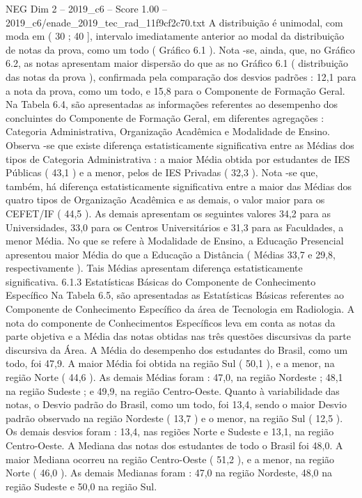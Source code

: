 \begin{textsample}{NEG Dim 2 – 2019\_c6 – Score 1.00 – 2019\_c6/enade\_2019\_tec\_rad\_11f9cf2c70.txt}
A distribuição é unimodal, com moda em ( 30 ; 40 ], intervalo imediatamente anterior ao modal da distribuição de notas da prova, como um todo ( Gráfico 6.1 ).
Nota -se, ainda, que, no Gráfico 6.2, as notas apresentam maior dispersão do que as no Gráfico 6.1 ( distribuição das notas da prova ), confirmada pela comparação dos desvios padrões : 12,1 para a nota da prova, como um todo, e 15,8 para o Componente de Formação Geral.
Na Tabela 6.4, são apresentadas as informações referentes ao desempenho dos concluintes do Componente de Formação Geral, em diferentes agregações : Categoria Administrativa, Organização Acadêmica e Modalidade de Ensino.
Observa -se que existe diferença estatisticamente significativa entre as Médias dos tipos de Categoria Administrativa : a maior Média obtida por estudantes de IES Públicas ( 43,1 ) e a menor, pelos de IES Privadas ( 32,3 ).
Nota -se que, também, há diferença estatisticamente significativa entre a maior das Médias dos quatro tipos de Organização Acadêmica e as demais, o valor maior para os CEFET/IF ( 44,5 ).
As demais apresentam os seguintes valores 34,2 para as Universidades, 33,0 para os Centros Universitários e 31,3 para as Faculdades, a menor Média.
No que se refere à Modalidade de Ensino, a Educação Presencial apresentou maior Média do que a Educação a Distância ( Médias 33,7 e 29,8, respectivamente ).
Tais Médias apresentam diferença estatisticamente significativa. 6.1.3 Estatísticas Básicas do Componente de Conhecimento Específico Na Tabela 6.5, são apresentadas as Estatísticas Básicas referentes ao Componente de Conhecimento Específico da área de Tecnologia em Radiologia.
A nota do componente de Conhecimentos Específicos leva em conta as notas da parte objetiva e a Média das notas obtidas nas três questões discursivas da parte discursiva da Área.
A Média do desempenho dos estudantes do Brasil, como um todo, foi 47,9.
A maior Média foi obtida na região Sul ( 50,1 ), e a menor, na região Norte ( 44,6 ).
As demais Médias foram : 47,0, na região Nordeste ; 48,1 na região Sudeste ; e 49,9, na região Centro-Oeste.
Quanto à variabilidade das notas, o Desvio padrão do Brasil, como um todo, foi 13,4, sendo o maior Desvio padrão observado na região Nordeste ( 13,7 ) e o menor, na região Sul ( 12,5 ).
Os demais desvios foram : 13,4, nas regiões Norte e Sudeste e 13,1, na região Centro-Oeste.
A Mediana das notas dos estudantes de todo o Brasil foi 48,0.
A maior Mediana ocorreu na região Centro-Oeste ( 51,2 ), e a menor, na região Norte ( 46,0 ).
As demais Medianas foram : 47,0 na região Nordeste, 48,0 na região Sudeste e 50,0 na região Sul.

\end{textsample}
